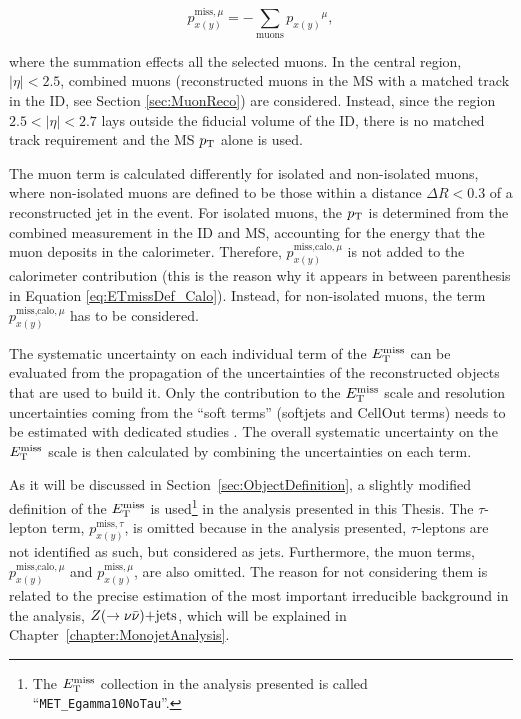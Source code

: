 \begin{equation}
p_{x(y)}^{\text{miss},\mu} = - \sum_{\text{muons}}{p_{x(y)}}^{\mu},
\label{eq:ETmissDef_Mu}
\end{equation}

\noindent where the summation effects all the selected muons.
In the central region, $|\eta|<2.5$, combined muons (reconstructed muons in the MS with a matched track in the ID, see Section \ref{sec:MuonReco}) are considered.
Instead, since the region $2.5<|\eta|<2.7$ lays outside the fiducial volume of the ID, there is no matched track requirement and the MS $p_{\mathrm{T}}$ alone is used.

The muon term is calculated differently for isolated and non-isolated muons, where non-isolated muons are defined to be those within a distance $\Delta R < 0.3$ of a reconstructed jet in the event.
For isolated muons, the $p_{\mathrm{T}}$ is determined from the combined measurement in the ID and MS, accounting for the energy that the muon deposits in the calorimeter.
Therefore, $p_{x(y)}^{\text{miss,calo},\mu}$ is not added to the calorimeter contribution (this is the reason why it appears in between parenthesis in Equation \ref{eq:ETmissDef_Calo}).
Instead, for non-isolated muons, the term $p_{x(y)}^{\text{miss,calo},\mu}$ has to be considered.

The systematic uncertainty on each individual term of the $E_{\mathrm{T}}^{\mathrm{miss}}$ can be evaluated from the propagation of the uncertainties of the reconstructed objects that are used to build it.
Only the contribution to the $E_{\mathrm{T}}^{\mathrm{miss}}$ scale and resolution uncertainties coming from the ``soft terms'' (softjets and CellOut terms) needs to be estimated with dedicated studies \cite{TheATLAScollaboration:2013oia}.
The overall systematic uncertainty on the $E_{\mathrm{T}}^{\mathrm{miss}}$ scale is then calculated by combining the uncertainties on each term.

As it will be discussed in Section~\ref{sec:ObjectDefinition}, a slightly modified definition of the $E_{\mathrm{T}}^{\mathrm{miss}}$ is used\footnote{The $E_{\mathrm{T}}^{\mathrm{miss}}$ collection in the analysis presented is called ``\texttt{MET\_Egamma10NoTau}''.} in the analysis presented in this Thesis.
The $\tau$-lepton term, $p_{x(y)}^{\text{miss},\tau}$, is omitted because in the analysis presented, $\tau$-leptons are not identified as such, but considered as jets.
Furthermore, the muon terms, $p_{x(y)}^{\text{miss,calo},\mu}$ and $p_{x(y)}^{\text{miss},\mu}$, are also omitted.
The reason for not considering them is related to the precise estimation of the most important irreducible background in the analysis, $Z(\rightarrow \nu \bar{\nu})\text{+jets}$, which will be explained in Chapter~\ref{chapter:MonojetAnalysis}.
